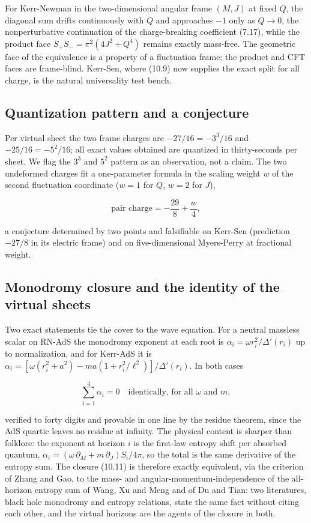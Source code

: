 \documentclass[11pt]{article}
\begin{document}
For Kerr-Newman in the two-dimensional angular frame $(M,J)$ at fixed $Q$, the diagonal sum drifts continuously with $Q$ and approaches $-1$ only as $Q \to 0$, the nonperturbative continuation of the charge-breaking coefficient (7.17), while the product face $S_+S_- = \pi^2(4J^2 + Q^4)$ remains exactly mass-free. The geometric face of the equivalence is a property of a fluctuation frame; the product and CFT faces are frame-blind. Kerr-Sen, where (10.9) now supplies the exact split for all charge, is the natural universality test bench.

\subsection{Quantization pattern and a conjecture}

Per virtual sheet the two frame charges are $-27/16 = -3^3/16$ and $-25/16 = -5^2/16$; all exact values obtained are quantized in thirty-seconds per sheet. We flag the $3^3$ and $5^2$ pattern as an observation, not a claim. The two undeformed charges fit a one-parameter formula in the scaling weight $w$ of the second fluctuation coordinate ($w = 1$ for $Q$, $w = 2$ for $J$),

\begin{equation*}
\text{pair charge} = -\frac{29}{8} + \frac{w}{4}, \tag{10.10}
\end{equation*}

a conjecture determined by two points and falsifiable on Kerr-Sen (prediction $-27/8$ in its electric frame) and on five-dimensional Myers-Perry at fractional weight.

\subsection{Monodromy closure and the identity of the virtual sheets}

Two exact statements tie the cover to the wave equation. For a neutral massless scalar on RN-AdS the monodromy exponent at each root is $\alpha_i = \omega r_i^2/\Delta'(r_i)$ up to normalization, and for Kerr-AdS it is $\alpha_i = [\omega(r_i^2 + a^2) - m a(1 + r_i^2/\ell^2)]/\Delta'(r_i)$. In both cases

\begin{equation*}
\sum_{i=1}^{4} \alpha_i = 0 \quad \text{identically, for all } \omega \text{ and } m, \tag{10.11}
\end{equation*}

verified to forty digits and provable in one line by the residue theorem, since the AdS quartic leaves no residue at infinity. The physical content is sharper than folklore: the exponent at horizon $i$ is the first-law entropy shift per absorbed quantum, $\alpha_i = (\omega\,\partial_M + m\,\partial_J)S_i/4\pi$, so the total is the same derivative of the entropy sum. The closure (10.11) is therefore exactly equivalent, via the criterion of Zhang and Gao, to the mass- and angular-momentum-independence of the all-horizon entropy sum of Wang, Xu and Meng and of Du and Tian: two literatures, black hole monodromy and entropy relations, state the same fact without citing each other, and the virtual horizons are the agents of the closure in both.
\end{document}
